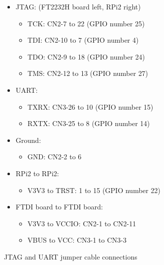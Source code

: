\documentclass[a4paper,11pt,reqno]{amsart}
\begin{document}
{\begin{figure}[hb]
\begin{center}
\begin{itemize}
	\item JTAG: (FT2232H board left, RPi2 right)
		\begin{itemize}
		\item TCK:   CN2-7   to 22 (GPIO number 25)
		\item TDI:   CN2-10  to 7 (GPIO number 4)
		\item TDO:   CN2-9   to 18 (GPIO number 24)
		\item TMS:   CN2-12  to 13 (GPIO number 27)
		\end{itemize}
	\item UART:
		\begin{itemize}
		\item TXRX:  CN3-26  to 10 (GPIO number 15)
		\item RXTX:  CN3-25  to 8 (GPIO number 14)
		\end{itemize}
	\item Ground:
		\begin{itemize}
		\item GND:   CN2-2   to 6
		\end{itemize}
	\item RPi2 to RPi2:
		\begin{itemize}
		\item V3V3 to TRST:  1    to 15 (GPIO number 22)
		\end{itemize}
	\item FTDI board to FTDI board:
		\begin{itemize}
		\item V3V3 to VCCIO: CN2-1   to CN2-11
		\item VBUS to VCC:   CN3-1   to CN3-3
		\end{itemize}
\end{itemize}
\end{center}
\caption{JTAG and UART jumper cable connections}
\label{fig:con2}
\end{figure}
\begin{figure}[hb]
\begin{center}

\end{center}
\end{figure}}
\end{document}
